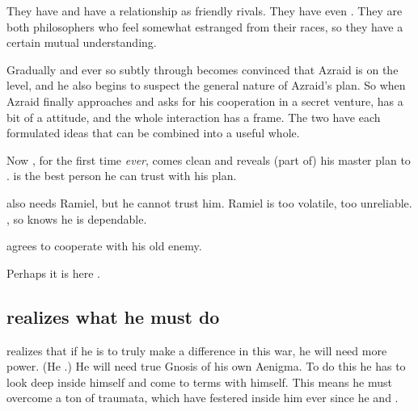 They have  and have a relationship as friendly rivals. 
They have even . 
They are both philosophers who feel somewhat estranged from their races, so they have a certain mutual understanding. 

Gradually and ever so subtly through  \Ishnaruchaefir becomes convinced that Azraid is on the level, and he also begins to suspect the general nature of Azraid's plan. 
So when Azraid finally approaches \Ishnaruchaefir and asks for his cooperation in a secret venture, \Ishnaruchaefir has a bit of a  attitude, and the whole interaction has a  frame.
The two have each formulated ideas that can be combined into a useful whole.

Now \Azraid{}, for the first time \emph{ever}, comes clean and reveals (part of) his master plan to \Ishnaruchaefir. 
\Ishnaruchaefir{} is the best person he can trust with his plan. 

\Azraid{} also needs Ramiel, but he cannot trust him.
Ramiel is too volatile, too unreliable. 
\Ishnaruchaefir{} , so \Azraid{} knows he is dependable.

\Ishnaruchaefir{} agrees to cooperate with his old enemy. 

Perhaps it is here \Azraid{} . 








\subsection{\Ishnaruchaefir realizes what he must do}
\Ishnaruchaefir{} realizes that if he is to truly make a difference in this war, he will need more power.
(He .)
He will need true Gnosis of his own Aenigma. 
To do this he has to look deep inside himself and come to terms with himself. 
This means he must overcome a ton of traumata, which have festered inside him ever since he  and . 

